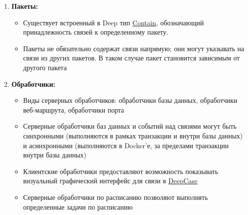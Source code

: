 \begin{enumerate}
      \item \textbf{Пакеты:}
            \begin{itemize}
                  \item Существует встроенный в Deep тип
                        \hyperlink{Core.Contain.Description}{Contain},
                        обозначающий
                        принадлежность связей к определенному пакету.
                  \item Пакеты не обязательно содержат связи напрямую; они
                        могут
                        указывать на связи из других пакетов. В таком случае
                        пакет
                        становится зависимым от другого пакета
            \end{itemize}

      \item \textbf{Обработчики:}
            \begin{itemize}
                  \item Виды серверных обработчиков: обработчики базы данных,
                        обработчики веб-маршрута, обработчики порта
                  \item Серверные обработчики баз данных и событий над связями
                        могут
                        быть синхронными (выполняются в рамках транзакции и
                        внутри базы
                        данных) и
                        асинхронными (выполняются в Docker'е, за пределами
                        транзакции
                        внутри базы
                        данных)
                  \item Клиентские обработчики предоставляют возможность
                        показывать
                        визуальный графический интерфейс для связи в
                        \hyperlink{DeepCase.Description}{DeepCase}
                  \item Серверные обработчики по расписанию позволяют выполнять
                        определенные задачи по расписанию
            \end{itemize}


\end{enumerate}
